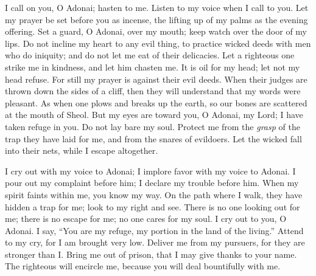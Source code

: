 \begin{biblechapter} %
 I call on you, O Adonai; hasten to me. 
Listen to my voice when I call to you.
\verse Let my prayer be set before you as incense, 
the lifting up of my palms as the evening offering.
\verse Set a guard, O Adonai, over my mouth; 
keep watch over the door of my lips.
\verse Do not incline my heart to any evil thing, 
to practice wicked deeds 
with men who do iniquity; 
and do not let me eat of their delicacies.
\verse Let a righteous one strike me in kindness, 
and let him chasten me. 
It is oil for my head; let not my head refuse. 
For still my prayer is against their evil deeds.
\verse When their judges are thrown down the sides of a cliff, 
then they will understand that my words were pleasant.
\verse As when one plows and breaks up the earth, 
so our bones are scattered at the mouth of Sheol.
\verse But my eyes are toward you, O Adonai, my Lord; 
I have taken refuge in you. Do not lay bare my soul.
\verse Protect me from the \textit{grasp} of the trap they have laid for me, 
and from the snares of evildoers.
\verse Let the wicked fall into their nets, 
while I escape altogether.
\end{biblechapter}

\begin{biblechapter} %
 I cry out with my voice to Adonai; 
I implore favor with my voice to Adonai.
\verse I pour out my complaint before him; 
I declare my trouble before him.
\verse When my spirit faints within me, 
you know my way. 
On the path where I walk, 
they have hidden a trap for me;
\verse look to my right and see. 
There is no one looking out for me; 
there is no escape for me; 
no one cares for my soul.
\verse I cry out to you, O Adonai. 
I say, “You are my refuge, 
my portion in the land of the living.”
\verse Attend to my cry, 
for I am brought very low. 
Deliver me from my pursuers, 
for they are stronger than I.
\verse Bring me out of prison, 
that I may give thanks to your name. 
The righteous will encircle me, 
because you will deal bountifully with me.
\end{biblechapter}

